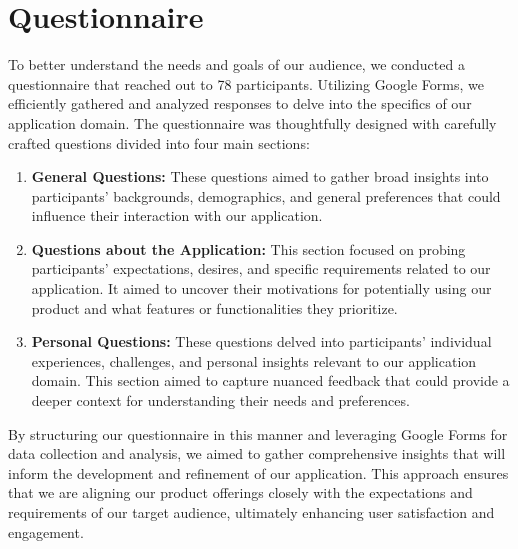 \section{Questionnaire}
To better understand the needs and goals of our audience, we conducted a questionnaire that reached out to 78 participants. Utilizing Google Forms, we efficiently gathered and analyzed responses to delve into the specifics of our application domain. The questionnaire was thoughtfully designed with carefully crafted questions divided into four main sections:

\begin{enumerate}
	\item \textbf{General Questions:}
	These questions aimed to gather broad insights into participants' backgrounds, demographics, and general preferences that could influence their interaction with our application.
	
	\item \textbf{Questions about the Application:}
	This section focused on probing participants' expectations, desires, and specific requirements related to our application. It aimed to uncover their motivations for potentially using our product and what features or functionalities they prioritize.
	
	\item \textbf{Personal Questions:}
	These questions delved into participants' individual experiences, challenges, and personal insights relevant to our application domain. This section aimed to capture nuanced feedback that could provide a deeper context for understanding their needs and preferences.
	
\end{enumerate}
By structuring our questionnaire in this manner and leveraging Google Forms for data collection and analysis, we aimed to gather comprehensive insights that will inform the development and refinement of our application. This approach ensures that we are aligning our product offerings closely with the expectations and requirements of our target audience, ultimately enhancing user satisfaction and engagement.\\
\clearpage
